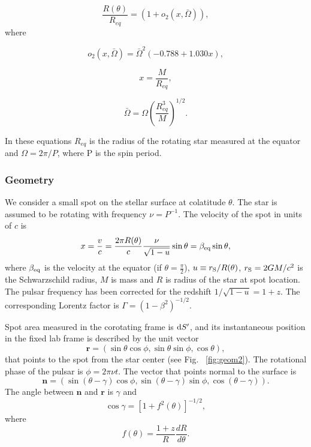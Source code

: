 \documentclass{wihuri}
\def\rg{r_{\rm S}} %
\def\be{\begin{equation}}
\def\ee{\end{equation}}
\def\d{{\rm d}}
\def\rg{r_{\rm S}} %
\newcommand{\bmath}[1]{\boldsymbol{#1}}
\begin{document}
\begin{equation}
\label{rtheta2}
\frac{R(\theta)}{R_{eq}} = (1 + o_{2}(x,\bar{\Omega})),
\end{equation}
where


\begin{equation}
\label{otwo}
o_{2}(x,\bar{\Omega}) = \bar{\Omega}^{2}(-0.788+1.030x),
\end{equation}


\begin{equation}
\label{rtheta2x}
x = \frac{M}{R_{eq}},
\end{equation}


\begin{equation}
\label{rtheta2omega}
\bar{\Omega} = \Omega (\frac{R_{eq}^{3}}{M})^{1/2}.
\end{equation}


In these equations $R_{eq}$ is the radius of the rotating star measured at the equator and $\Omega = 2\pi/P$, where P is the spin period.


\subsubsection{Geometry}

We consider a small spot on the stellar surface at colatitude $\theta$. 
The star is assumed to be rotating  with frequency $\nu=P^{-1}$.
The velocity of the spot in units of $c$ is 
\begin{equation}
\label{beta2}
x = \frac{v}{c}=\frac{2\pi R(\theta)}{c} \frac{\nu}{\sqrt{1-u}} \sin\theta =\beta_{\rm eq} \sin\theta,
\end{equation}
where $\beta_{\rm eq}$ is the velocity at the equator (if $\theta = \frac{\pi}{2}$), $u\equiv\rg/R(\theta)$, 
$\rg=2GM/c^2$ is the Schwarzschild radius, $M$ is mass and $R$ is
radius of the star at spot location. The pulsar frequency has been corrected for the redshift $1/\sqrt{1-u}=1+z$.
The corresponding Lorentz factor is $\Gamma=(1-\beta^2)^{-1/2}$.



Spot area measured in the corotating frame is $\d S^\prime$, and its instantaneous position in
the fixed lab frame is described by the unit vector 
\begin{equation}
\bmath{r}=(\sin\theta\cos\phi, \sin\theta\sin\phi, \cos\theta),
\end{equation}
that points to the spot from the star center (see Fig. ~\ref{fig:geom2}). The rotational phase of the pulsar is $\phi=2\pi\nu t$. The vector that points normal to the surface is
\begin{equation}
\bmath{n}=(\sin(\theta-\gamma)\cos\phi, \sin(\theta-\gamma)\sin\phi, \cos(\theta-\gamma)).
\end{equation}
The angle between $\bmath{n}$ and $\bmath{r}$ is $\gamma$ and 
\begin{equation}
\cos\gamma=[1+f^{2}(\theta)]^{-1/2},
\end{equation}
where
\be \label{eq:ftheta}
f(\theta)=\frac{1+z}{R}\frac{dR}{d\theta}.
\ee
\end{document}
